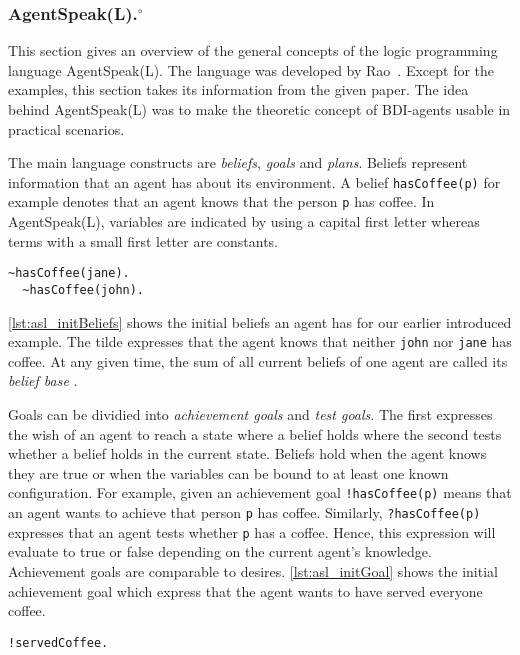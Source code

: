 \subsubsection[AgentSpeak(L).]{AgentSpeak(L).$^\circ$}\label{fun:apl_asl}
This section gives an overview of the general concepts of the logic programming language AgentSpeak(L).
The language was developed by Rao~\cite{rao_agentspeak_1996}.
Except for the examples, this section takes its information from the given paper.
The idea behind AgentSpeak(L) was to make the theoretic concept of BDI-agents usable in practical scenarios. %

The main language constructs are \emph{beliefs}, \emph{goals} and \emph{plans}.
Beliefs represent information that an agent has about its environment. A belief \texttt{hasCoffee(p)} for example denotes that an agent knows that the person \texttt{p} has coffee. In AgentSpeak(L), variables are indicated by using a capital first letter whereas terms with a small first letter are constants. %
\begin{lstlisting}[caption={Initial beliefs.}, label=lst:asl_initBeliefs]
  ~hasCoffee(jane).
  ~hasCoffee(john).
\end{lstlisting}
\autoref{lst:asl_initBeliefs} shows the initial beliefs an agent has for our earlier introduced example. The tilde expresses that the agent knows that neither \texttt{john} nor \texttt{jane} has coffee. At any given time, the sum of all current beliefs of one agent are called its \emph{belief base} \cite{bordini_jason_2005}. %

Goals can be dividied into \emph{achievement goals} and \emph{test goals}.
The first expresses the wish of an agent to reach a state where a belief holds where the second tests whether a belief holds in the current state. Beliefs hold when the agent knows they are true or when the variables can be bound to at least one known configuration.
For example, given an achievement goal \texttt{!hasCoffee(p)} means that an agent wants to achieve that person \texttt{p} has coffee. Similarly, \texttt{?hasCoffee(p)} expresses that an agent tests whether \texttt{p} has a coffee. Hence, this expression will evaluate to true or false depending on the current agent's knowledge.
Achievement goals are comparable to desires. %
\autoref{lst:asl_initGoal} shows the initial achievement goal which express that the agent wants to have served everyone coffee.
\begin{lstlisting}[firstnumber=3, caption={Initial goal.}, label=lst:asl_initGoal]
  !servedCoffee.
\end{lstlisting}

